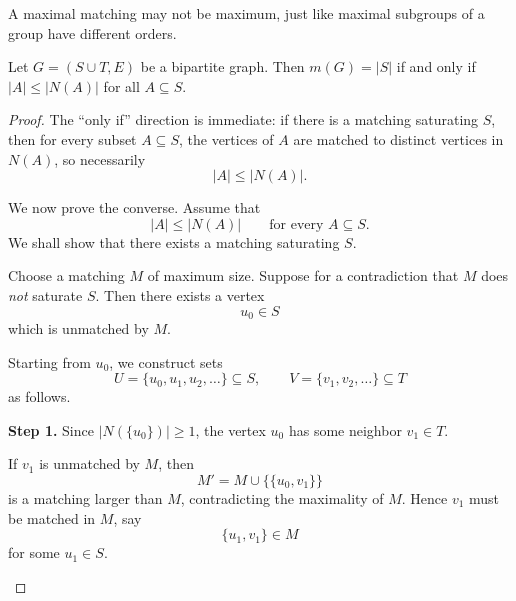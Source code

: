 \documentclass[11pt, a4paper]{ctexrep}
\begin{document}
\begin{remark}
    A maximal matching may not be maximum, just like maximal subgroups of a group have different orders.
\end{remark}

\begin{theorem}\label{thm:hall}
    Let $G=(S\cup T,E)$ be a bipartite graph.
    Then $m(G)=|S|$ if and only if $|A|\leqslant |N(A)|$ for all $A\subseteq S$.
\end{theorem}

\begin{proof}
    The ``only if'' direction is immediate: if there is a matching saturating $S$,
    then for every subset $A \subseteq S$, the vertices of $A$ are matched to
    distinct vertices in $N(A)$, so necessarily
    \[
        |A| \le |N(A)|.
    \]

    We now prove the converse. Assume that
    \[
        |A| \le |N(A)| \qquad \text{for every } A \subseteq S.
    \]
    We shall show that there exists a matching saturating $S$.

    Choose a matching $M$ of maximum size. Suppose for a contradiction that
    $M$ does \emph{not} saturate $S$. Then there exists a vertex
    \[
        u_0 \in S
    \]
    which is unmatched by $M$.

    Starting from $u_0$, we construct sets
    \[
        U=\{u_0,u_1,u_2,\dots\}\subseteq S,
        \qquad
        V=\{v_1,v_2,\dots\}\subseteq T
    \]
    as follows.

    \medskip

    \noindent
    \textbf{Step 1.}
    Since $|N(\{u_0\})| \ge 1$, the vertex $u_0$ has some neighbor $v_1 \in T$.

    If $v_1$ is unmatched by $M$, then
    \[
        M' = M \cup \{\{u_0,v_1\}\}
    \]
    is a matching larger than $M$, contradicting the maximality of $M$.
    Hence $v_1$ must be matched in $M$, say
    \[
        \{u_1,v_1\}\in M
    \]
    for some $u_1\in S$.

    \begin{center}
\end{center}
\end{proof}
\end{document}
